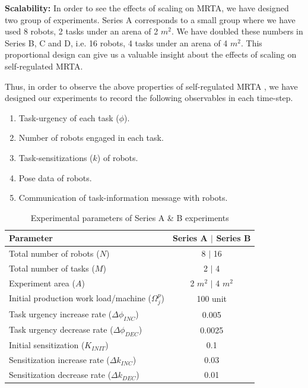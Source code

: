 \documentclass[final,5p,times,twocolumn]{elsarticle}
\begin{document}
\textbf{Scalability:} In order to see the effects of scaling on MRTA, we have designed two group of experiments. Series A corresponds to a small group where we have used 8 robots, 2 tasks under an arena of 2 $m^2$. We have doubled these numbers in Series B, C and D, i.e. 16 robots, 4 tasks under an arena of 4 $m^2$. This proportional design can give us a valuable insight about the effects of scaling on self-regulated MRTA. 

Thus, in order to observe the above properties of self-regulated MRTA , we have designed our experiments to record the following  observables in each time-step.
\begin{enumerate}
\item Task-urgency of each task ($\phi$).
\item Number of robots engaged in each task.
\item Task-sensitizations ($k$) of robots.
\item Pose data of robots.
\item Communication of task-information message with robots.  
\end{enumerate}
\begin{table}
\caption{Experimental parameters of Series A \& B experiments}
\label{table:params}
\begin{center}
\begin{tabular}{|p{2in}|c|}
\hline Parameter & Series A $\mid$ Series B\\
\hline Total number of robots ($N$) & \hspace*{0.1cm} 8 $\mid$ 16\\
\hline Total number of tasks ($M$) & 2 $\mid$ 4\\
\hline Experiment area ($A$) & 2 $m^2$ $\mid$  4 $m^2$\\
\hline Initial production work load/machine ($\Omega_{j}^{p}$) & 100 unit \\
\hline Task urgency increase rate ($\Delta\phi_{INC}$) & 0.005\\
\hline Task urgency decrease rate ($\Delta\phi_{DEC}$) & 0.0025\\
\hline Initial sensitization ($K_{INIT}$) & 0.1\\
\hline Sensitization increase rate ($\Delta k_{INC}$) & 0.03\\
\hline Sensitization decrease rate ($\Delta k_{DEC}$) & 0.01\\
\hline
\end{tabular}
\end{center}
\end{table}
\end{document}
